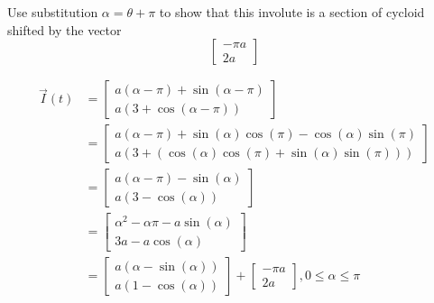 \documentclass[titlepage]{article}
\begin{document}
\begin{problem}{3}
Use substitution $\alpha = \theta + \pi$ to show that this involute is a section of cycloid shifted by the vector $$\begin{bmatrix}-\pi a \\ 2a\end{bmatrix}$$
\end{problem}
\clearpage
\begin{solution}
\begin{align*}
\vec{I}(t) &= \begin{bmatrix} a(\alpha-\pi) + \sin(\alpha - \pi) \\ a(3+\cos(\alpha-\pi))\end{bmatrix}\\
 &= \begin{bmatrix} a(\alpha - \pi) + \sin(\alpha)\cos(\pi) - \cos(\alpha)\sin(\pi) \\ a(3+(\cos(\alpha)\cos(\pi) + \sin(\alpha)\sin(\pi)))\end{bmatrix}\\
 &= \begin{bmatrix}a(\alpha - \pi) - \sin(\alpha) \\ a(3-\cos(\alpha)) \end{bmatrix}\\
 &= \begin{bmatrix} \alpha^2-\alpha\pi-a\sin(\alpha) \\ 3a-a\cos(\alpha)\end{bmatrix} \\
 &= \begin{bmatrix}a(\alpha - \sin(\alpha)) \\ a(1-\cos(\alpha))\end{bmatrix} + \begin{bmatrix}-\pi a \\ 2a \end{bmatrix}, 0 \leq \alpha \leq \pi
\end{align*}
\end{solution}
\end{document}

